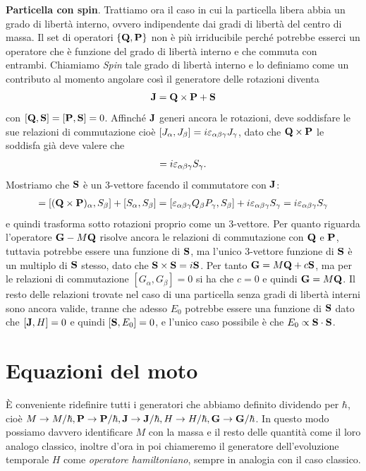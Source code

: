 \textbf{Particella con spin}. Trattiamo ora il caso in cui la particella libera abbia un grado di libertà interno, ovvero indipendente dai gradi di 
libertà del centro di massa. Il set di operatori $ \{\mathbf{Q}, \mathbf{P}\} $ non è più irriducibile perché potrebbe esserci un operatore che è funzione del 
grado di libertà interno e che commuta con entrambi. Chiamiamo \textit{Spin} tale grado di libertà interno e lo definiamo come un contributo al 
momento angolare così il generatore delle rotazioni diventa 
\begin{align*}
  \mathbf{J} = \mathbf{Q\times P} + \mathbf{S}
\end{align*}
con $ [\mathbf{Q}, \mathbf{S}] = [\mathbf{P}, \mathbf{S}] = 0 $. Affinché $ \mathbf{J} $ generi ancora le rotazioni, deve soddisfare le sue relazioni di commutazione cioè 
$ [J_\alpha, J_\beta] = i \varepsilon_{\alpha \beta \gamma} J_\gamma $, dato che $ \mathbf{Q \times P} $ le soddisfa già deve valere che 
\begin{align*}
  [S_\alpha, S_\beta] = i \eps_{\alpha \beta \gamma} S_\gamma.
\end{align*}
Mostriamo che $ \mathbf{S} $ è un 3-vettore facendo il commutatore con $ \mathbf{J} $:
\begin{align*}
  [J_\alpha, S_\beta] = [(\v{Q\times P})_\alpha,S_\beta] + [S_\alpha, S_\beta] 
  = [\eps_{\alpha \beta \gamma} Q_\beta P_\gamma , S_\beta] + i \eps_{\alpha \beta \gamma} S_\gamma = i\eps_{\alpha \beta \gamma}S_\gamma
\end{align*}
e quindi trasforma sotto rotazioni proprio come un 3-vettore. Per quanto riguarda l'operatore $ \mathbf{G} - M\mathbf{Q} $ risolve ancora le relazioni di 
commutazione con $ \mathbf{Q} $ e $ \mathbf{P} $, tuttavia potrebbe essere una funzione di $ \mathbf{S} $, ma l'unico 3-vettore funzione di $ \mathbf{S} $ è 
un multiplo di $ \mathbf{S} $ stesso, dato che $ \mathbf{S \times S} = i\mathbf{S} $. Per tanto $ \mathbf{G} = M\mathbf{Q} + c\mathbf{S} $, ma per le relazioni di commutazione 
$ [G_\alpha,G_\beta] = 0 $ si ha che $ c = 0 $ e quindi $ \mathbf{G} = M\mathbf{Q} $. Il resto delle relazioni trovate nel caso di una particella senza gradi di 
libertà interni sono ancora valide, tranne che adesso $ E_0 $ potrebbe essere una funzione di $ \mathbf{S} $ dato che $ [\mathbf{J}, H] = 0 $ e quindi 
$ [\mathbf{S}, E_0] = 0 $, e l'unico caso possibile è che $ E_0 \propto \mathbf{S\cdot S} $.


\section{Equazioni del moto}
È conveniente ridefinire tutti i generatori che abbiamo definito dividendo per $ \hbar $, cioè 
$ M \to M/\hbar, \mathbf{P} \to \mathbf{P}/\hbar, \mathbf{J} \to \mathbf{J}/\hbar, H \to H/\hbar, \mathbf{G} \to \mathbf{G}/\hbar $. In questo modo possiamo davvero identificare $ M $ 
con la massa e il resto delle quantità come il loro analogo classico, inoltre d'ora in poi chiameremo il generatore dell'evoluzione temporale $ H $ come 
\textit{operatore hamiltoniano}, sempre in analogia con il caso classico.
 

